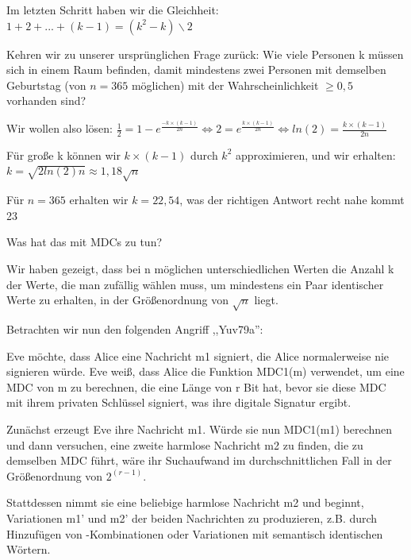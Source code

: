 \documentclass[a4paper]{article}
\begin{document}
\begin{multicols}{3}
\begin{itemize*}
            \item Im letzten Schritt haben wir die Gleichheit: $1+2+...+(k-1)=(k^2 - k)\backslash 2$
            \item Kehren wir zu unserer ursprünglichen Frage zurück: Wie viele Personen k müssen sich in einem Raum befinden, damit mindestens zwei Personen mit demselben Geburtstag (von $n=365$ möglichen) mit der Wahrscheinlichkeit $\geq 0,5$ vorhanden sind?
            \begin{itemize*}
                  \item Wir wollen also lösen: $\frac{1}{2}=1-e^{\frac{-k\times(k-1)}{2n}}\Leftrightarrow 2=e^{\frac{k\times(k-1)}{2n}}\Leftrightarrow ln(2)=\frac{k\times(k-1)}{2n}$
                  \item Für große k können wir $k\times(k-1)$ durch $k^2$ approximieren, und wir erhalten: $k=\sqrt{2 ln(2)n}\approx 1,18\sqrt{n}$
                  \item Für $n=365$ erhalten wir $k=22,54$, was der richtigen Antwort recht nahe kommt 23
            \end{itemize*}
            \item Was hat das mit MDCs zu tun?
            \item Wir haben gezeigt, dass bei n möglichen unterschiedlichen Werten die Anzahl k der Werte, die man zufällig wählen muss, um mindestens ein Paar identischer Werte zu erhalten, in der Größenordnung von $\sqrt{n}$ liegt.
            \item Betrachten wir nun den folgenden Angriff ,,Yuv79a'':
            \begin{itemize*}
                  \item Eve möchte, dass Alice eine Nachricht m1 signiert, die Alice normalerweise nie signieren würde. Eve weiß, dass Alice die Funktion MDC1(m) verwendet, um eine MDC von m zu berechnen, die eine Länge von r Bit hat, bevor sie diese MDC mit ihrem privaten Schlüssel signiert, was ihre digitale Signatur ergibt.
                  \item Zunächst erzeugt Eve ihre Nachricht m1. Würde sie nun MDC1(m1) berechnen und dann versuchen, eine zweite harmlose Nachricht m2 zu finden, die zu demselben MDC führt, wäre ihr Suchaufwand im durchschnittlichen Fall in der Größenordnung von $2^{(r-1)}$.
                  \item Stattdessen nimmt sie eine beliebige harmlose Nachricht m2 und beginnt, Variationen m1' und m2' der beiden Nachrichten zu produzieren, z.B. durch Hinzufügen von -Kombinationen oder Variationen mit semantisch identischen Wörtern.

\end{itemize*}
\end{itemize*}
\end{multicols}
\end{document}
